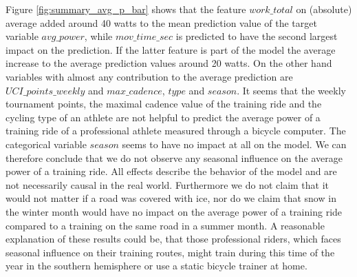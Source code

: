 \documentclass[12pt,a4paper]{article}
\begin{document}
Figure \ref{fig:summary_avg_p_bar} shows that the feature \(work\_total\) on (absolute) average added around 40 watts to the mean prediction value of the target variable \(avg\_power\),
while \(mov\_time\_sec\) is predicted to have the second largest impact on the prediction. If the latter feature is part of the model the average increase to the average prediction values around 20 watts. On the other hand variables with almost any contribution to the average prediction are \(UCI\_points\_weekly\) and \(max\_cadence\), \(type\) and \(season\). It seems that the weekly tournament points, the maximal cadence value of the training ride and the cycling type of an athlete are not helpful to predict the average power of a training ride of a professional athlete measured through a bicycle computer. The categorical variable \(season\) seems to have no impact at all on the model. We can therefore conclude that we do not observe any seasonal influence on the average power of a training ride. All effects describe the behavior of the model and are not necessarily causal in the real world. Furthermore we do not claim that it would not matter if a road was covered with ice, nor do we claim that snow in the winter month would have no impact on the average power of a training ride compared to a training on the same road in a summer month. A reasonable explanation of these results could be, that those professional riders, which faces seasonal influence on their training routes, might train during this time of the year in the southern hemisphere or use a static bicycle trainer at home.
\end{document}

